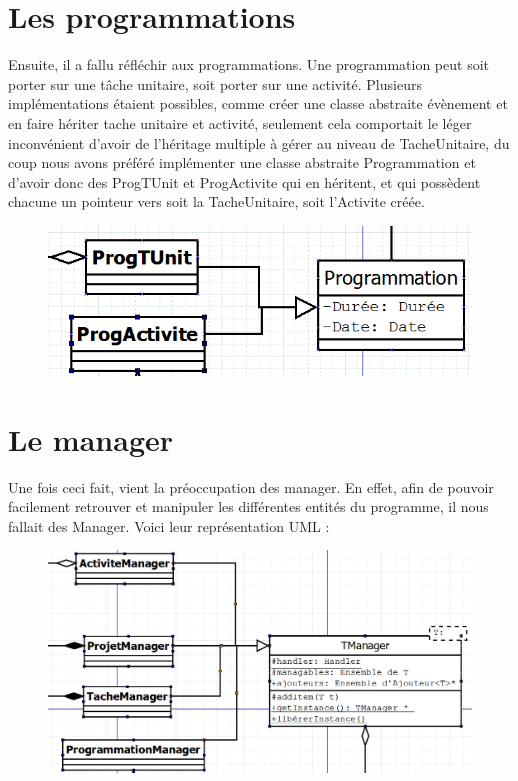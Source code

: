 \section{Les programmations}
Ensuite, il a fallu réfléchir aux programmations. Une programmation peut soit porter sur une tâche unitaire, soit porter sur une activité. 
Plusieurs implémentations étaient possibles, comme créer une classe abstraite évènement et en faire hériter tache unitaire et activité, seulement cela comportait le léger inconvénient d’avoir de l’héritage multiple à gérer au niveau de TacheUnitaire, du coup nous avons préféré implémenter une classe abstraite Programmation et d’avoir donc des ProgTUnit et ProgActivite qui en héritent, et qui possèdent chacune un pointeur vers soit la TacheUnitaire, soit l’Activite créée.
\begin{figure}[h]
	\includegraphics[scale=0.5]{ressources/figure2.png}
\end{figure}

\section{Le manager}
Une fois ceci fait, vient la préoccupation des manager. En effet, afin de pouvoir facilement retrouver et manipuler les différentes entités du programme, il nous fallait des Manager.
Voici leur représentation UML :
\begin{figure}[h]
	\includegraphics[scale=0.4]{ressources/figure3.png}
\end{figure}

